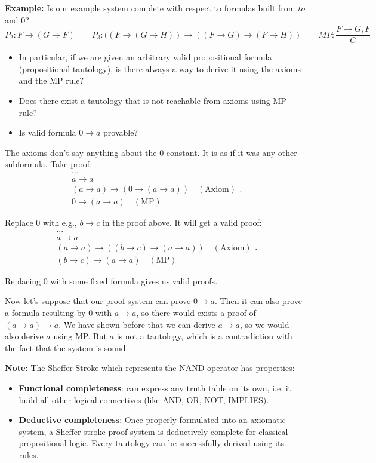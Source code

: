 \documentclass[11pt]{article}
\begin{document}
\textbf{Example: } Is our example system complete with respect to formulas built from $to$ and $0$? $$  P_2 : F \to (G \to F) \quad \quad P_3 : ((F \to (G \to H)) \to ((F \to G) \to (F \to H)) \quad \quad MP : \frac{F \to G, F}{G} $$ 

\begin{itemize}
	\item In particular, if we are given an arbitrary valid propositional formula (propositional tautology), is there always a way to derive it using the axioms and the MP rule? 
	\item Does there exist a tautology that is not reachable from axioms using MP rule?
	\item Is valid formula $ 0 \to a$ provable? 
\end{itemize}

The axioms don't say anything about the $0$ constant. It is as if it was any other subformula. Take proof: 
\[
	\begin{array}{l}
	... \\
	a \to a\\ 
	(a \to a) \to (0 \to (a \to a)) \quad (\text{Axiom}) \\
	0 \to (a \to a) \quad (\text{MP})
	\end{array}
.\] 

Replace 0 with e.g., $b \to c$ in the proof above. It will get a valid proof: 
\[
	\begin{array}{l}
		... \\
		a \to a \\ 
		(a \to a) \to ((b \to c) \to (a \to a)) \quad (\text{Axiom}) \\ 
		(b \to c) \to (a \to a) \quad (\text{MP})
	\end{array}
.\] 

Replacing 0 with some fixed formula gives us valid proofs. 

Now let's suppose that our proof system can prove $0 \to a$. Then it can also prove a formula resulting by $0$ with $a \to a$, so there would exists a proof of $(a \to a) \to a$. 
We have shown before that we can derive $a \to a$, so we would also derive $a$ using MP. But $a$ is not a tautology, which is a contradiction with the fact that the system is sound. 

\textbf{Note:} The Sheffer Stroke which represents the NAND operator has properties: 
\begin{itemize}
	\item \textbf{Functional completeness}: can express any truth table on its own, i.e, it build all other logical connectives (like AND, OR, NOT, IMPLIES). 
	\item \textbf{Deductive completeness}: Once properly formulated into an axiomatic system, a Sheffer stroke proof system is deductively complete for classical propositional logic. Every tautology can be successfully derived using its rules.
\end{itemize}
\end{document}
